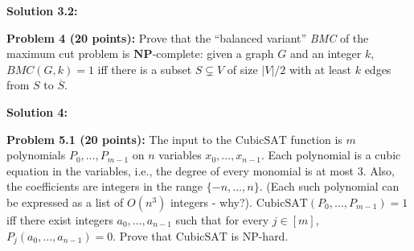 \documentclass[11pt]{article}
\begin{document}
\textbf{Solution 3.2:}

\textbf{Problem 4 (20 points):} Prove that the ``balanced variant'' \emph{BMC} of
the maximum cut problem is \(\mathbf{NP}\)-complete: given a graph $G$ and an integer $k$, $BMC(G,k) = 1$ iff there is a subset $S \subsetneq V$ of size $|V|/2$ with at least $k$ edges from $S$ to $\overline{S}$.

\textbf{Solution 4:}

\newcommand{\CSAT}{\mathrm{CubicSAT}}

\textbf{Problem 5.1 (20 points):} The input to the $\CSAT$ function is $m$ polynomials $P_0,\ldots,P_{m-1}$ on $n$ variables $x_0,\ldots,x_{n-1}$. Each polynomial is a cubic equation in the variables, i.e., the degree of every monomial is at most $3$. Also, the coefficients are integers in the range $\{-n,\ldots,n\}$. (Each such polynomial can be expressed as a list of $O(n^3)$ integers - why?). $\CSAT(P_0,\ldots,P_{m-1}) = 1$ iff there exist integers $a_0,\ldots,a_{n-1}$ such that for every $j \in [m]$, $P_j(a_0,\ldots,a_{n-1})=0$. Prove that $\CSAT$ is NP-hard.
\end{document}
